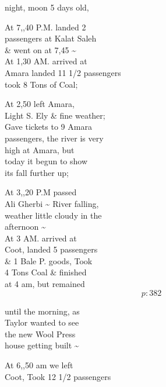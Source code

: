 \documentclass{report}
\begin{document}

	\par{
 	night, moon 5 days old,\ \\
	}

	\par{
 	At 7,,40 P.M. landed 2\ \\passengers at Kalat Saleh\ \\\& went on at 7,45 \~{}\ \\At 1,30 AM. arrived at\ \\Amara landed 11 1/2 passengers\ \\took 8 Tons of Coal;\ \\
	}

	\par{
 	At 2,50 left Amara,\ \\Light S. Ely \& fine weather;\ \\Gave tickets to 9 Amara\ \\passengers, the river is very\ \\high at Amara, but\ \\today it begun to show\ \\its fall further up;\ \\
	}

	\par{
 	At 3,,20 P.M passed\ \\Ali Gherbi \~{} River falling,\ \\weather little cloudy in the\ \\afternoon \~{}\ \\At 3 AM. arrived at\ \\Coot, landed 5 passengers\ \\\& 1 Bale P. goods, Took\ \\4 Tons Coal \& finished\ \\at 4 am, but remained\ \\
  \[p: 382 \]

	}

	\par{
 	until the morning, as\ \\Taylor wanted to see\ \\the new Wool Press\ \\house getting built \~{}\ \\
	}

	\par{
 	At 6,,50 am we left\ \\Coot, Took 12 1/2 passengers\ \\
	}
\end{document}
